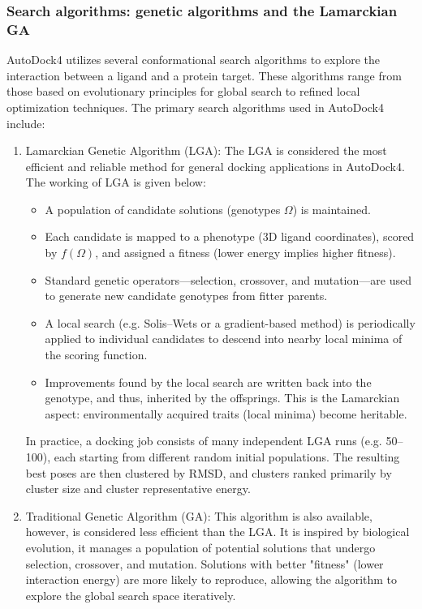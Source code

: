 \documentclass[12pt, a4paper]{article}
\begin{document}
\subsubsection{Search algorithms: genetic algorithms and the Lamarckian GA}

AutoDock4 utilizes several conformational search algorithms to explore the interaction between a ligand and a protein target\cite{CH7_Morris1998,CH7_Morris2009}. These algorithms range from those based on evolutionary principles for global search to refined local optimization techniques.
The primary search algorithms used in AutoDock4 include:
\begin{enumerate}
\item Lamarckian Genetic Algorithm (LGA): 
The LGA is considered the most efficient and reliable method for general docking applications in AutoDock4.
The working of LGA is given below:
\begin{itemize}
  \item A population of candidate solutions (genotypes $ \Omega $) is maintained.
  \item Each candidate is mapped to a phenotype (3D ligand coordinates), scored by $ f(\Omega) $, and assigned a fitness (lower energy implies higher fitness).
  \item Standard genetic operators---selection, crossover, and mutation---are used to generate new candidate genotypes from fitter parents.
  \item A local search (e.g. Solis--Wets or a gradient-based method) is periodically applied to individual candidates to descend into nearby local minima of the scoring function.\cite{CH7_Morris1998,CH7_SantosMartins2021}
  \item Improvements found by the local search are written back into the genotype, and thus, inherited by the offsprings. This is the Lamarckian aspect: environmentally acquired traits (local minima) become heritable.
\end{itemize}

In practice, a docking job consists of many independent LGA runs (e.g. 50--100), each starting from different random initial populations. The resulting best poses are then clustered by RMSD, and clusters ranked primarily by cluster size and cluster representative energy.\cite{CH7_Morris2009}

\item Traditional Genetic Algorithm (GA): 
This algorithm is also available, however, is considered less efficient than the LGA. It is inspired by biological evolution, it manages a population of potential solutions that undergo selection, crossover, and mutation. Solutions with better "fitness" (lower interaction energy) are more likely to reproduce, allowing the algorithm to explore the global search space iteratively.


\end{enumerate}
\end{document}
